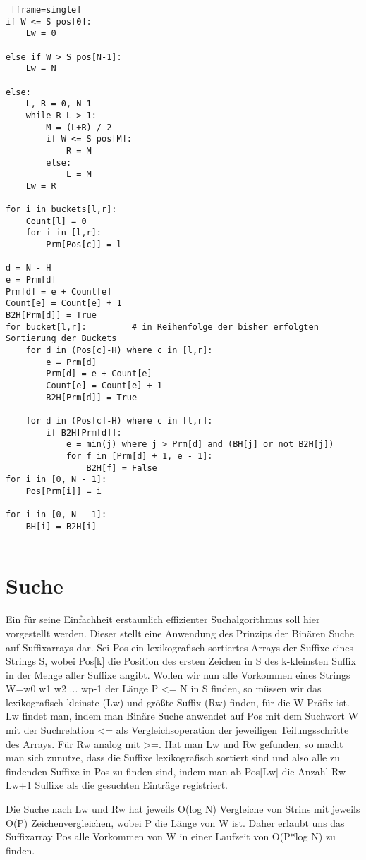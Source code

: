 \documentclass[twoside]{article}
\begin{document}
\begin{lstlisting} [frame=single]
if W <= S pos[0]:
    Lw = 0

else if W > S pos[N-1]:
    Lw = N

else:
    L, R = 0, N-1
    while R-L > 1:
        M = (L+R) / 2
        if W <= S pos[M]:
            R = M
        else:
            L = M
    Lw = R

for i in buckets[l,r]:
    Count[l] = 0
    for i in [l,r]:
        Prm[Pos[c]] = l

d = N - H
e = Prm[d]
Prm[d] = e + Count[e]
Count[e] = Count[e] + 1
B2H[Prm[d]] = True
for bucket[l,r]:         # in Reihenfolge der bisher erfolgten Sortierung der Buckets
    for d in (Pos[c]-H) where c in [l,r]:
        e = Prm[d]
        Prm[d] = e + Count[e]
        Count[e] = Count[e] + 1
        B2H[Prm[d]] = True

    for d in (Pos[c]-H) where c in [l,r]:
        if B2H[Prm[d]]:
            e = min(j) where j > Prm[d] and (BH[j] or not B2H[j])
            for f in [Prm[d] + 1, e - 1]:
                B2H[f] = False
for i in [0, N - 1]:
    Pos[Prm[i]] = i

for i in [0, N - 1]:
    BH[i] = B2H[i]


\end{lstlisting}

\section{Suche}
Ein für seine Einfachheit erstaunlich effizienter Suchalgorithmus soll hier
vorgestellt werden. Dieser stellt eine Anwendung des Prinzips der Binären Suche
auf Suffixarrays dar.
Sei Pos ein lexikografisch sortiertes Arrays der Suffixe eines Strings S, wobei
Pos[k] die Position des ersten Zeichen in S des k-kleinsten Suffix in der Menge
aller Suffixe angibt.
Wollen wir nun alle Vorkommen eines Strings W=w0 w1 w2 ... wp-1 der Länge P <= N
in S finden, so müssen wir das lexikografisch kleinste (Lw) und größte Suffix (Rw) finden,
für die W Präfix ist.
Lw findet man, indem man Binäre Suche anwendet auf Pos mit dem Suchwort W mit der
Suchrelation <= als Vergleichsoperation der jeweiligen Teilungsschritte des Arrays.
Für Rw analog mit >=.
Hat man Lw und Rw gefunden, so macht man sich zunutze, dass die Suffixe lexikografisch sortiert
sind und also alle zu findenden Suffixe in Pos zu finden sind, indem man ab Pos[Lw]
die Anzahl Rw-Lw+1 Suffixe als die gesuchten Einträge registriert.

Die Suche nach Lw und Rw hat jeweils O(log N) Vergleiche von Strins mit jeweils
O(P) Zeichenvergleichen, wobei P die Länge von W ist. Daher erlaubt uns das Suffixarray
Pos alle Vorkommen von W in einer Laufzeit von O(P*log N) zu finden.
\end{document}
